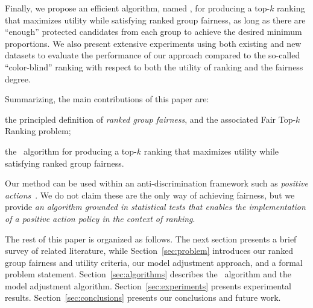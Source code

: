 Finally, we propose an efficient algorithm, named \algoFAIR, for producing a top-$k$ ranking that maximizes utility while satisfying ranked group fairness, as long as there are ``enough'' protected candidates from each group to achieve the desired minimum proportions.
%
We also present extensive experiments using both existing and new datasets to evaluate the performance of our approach compared to the so-called ``color-blind'' ranking with respect to both the utility of ranking and the fairness degree.

Summarizing, the main contributions of this paper are:
\begin{compactenum}
	\item the principled definition of \emph{ranked group fairness}, and the associated  {\sc Fair Top-$k$ Ranking problem};
	\item the \algoFAIR\ algorithm for producing a top-$k$ ranking that maximizes utility while satisfying ranked group fairness.
\end{compactenum}

Our method can be used within an anti-discrimination framework such as \emph{positive actions}~\cite{sowell2005affirmative}. We do not claim these are the only way of achieving fairness, but we provide \emph{an algorithm grounded in statistical tests that enables the implementation of a positive action policy in the context of ranking}.

The rest of this paper is organized as follows.
%
The next section presents a brief survey of related literature, while Section~\ref{sec:problem} introduces our ranked group fairness and utility criteria, our model adjustment approach, and a formal problem statement.
%
Section~\ref{sec:algorithms} describes the \algoFAIR\ algorithm and the model adjustment algorithm.
%
Section~\ref{sec:experiments} presents experimental results.
%
Section~\ref{sec:conclusions} presents our conclusions and future work.

